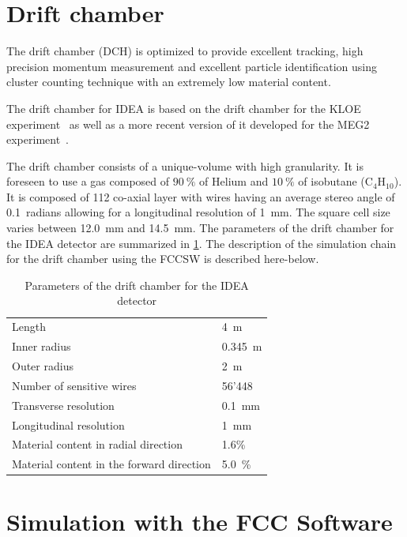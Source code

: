 \section{Drift chamber}
The drift chamber (DCH) is optimized to provide excellent tracking, high precision momentum measurement and excellent particle identification using cluster counting technique with an extremely low material content.

The drift chamber for IDEA is based on the drift chamber for the KLOE experiment~\cite{DeLucia:2018qoc} as well as a more recent version of it developed for the MEG2 experiment~\cite{Baldini:2018nnn}.

The drift chamber consists of a unique-volume with high granularity. It is foreseen to use a gas composed of $90~\%$ of Helium and $10~\%$ of isobutane ($\text{C}_{4}\text{H}_{10}$). It is composed of 112 co-axial layer with wires having an average stereo angle of 0.1~radians allowing for a longitudinal resolution of 1~mm. The square cell size varies between 12.0~mm and 14.5~mm. The parameters of the drift chamber for the IDEA detector are summarized in \cref{driftChamberParams}. The description of the simulation chain for the drift chamber using the FCCSW is described here-below.

\begin{table}[!t]
	\renewcommand{\arraystretch}{1.3}
	\caption{Parameters of the drift chamber for the IDEA detector}
	\label{driftChamberParams}
	\centering
	\begin{tabular}{l l}
		\toprule
			Length & 4~m \\
      Inner radius & 0.345~m \\
      Outer radius & 2~m\\
      Number of sensitive wires & 56'448 \\
      Transverse resolution & 0.1~mm \\
			Longitudinal resolution & 1~mm \\
			Material content in radial direction & 1.6\% \\
			Material content in the forward direction & 5.0~\% \\
		\bottomrule
	\end{tabular}
\end{table}


\section{Simulation with the FCC Software}

